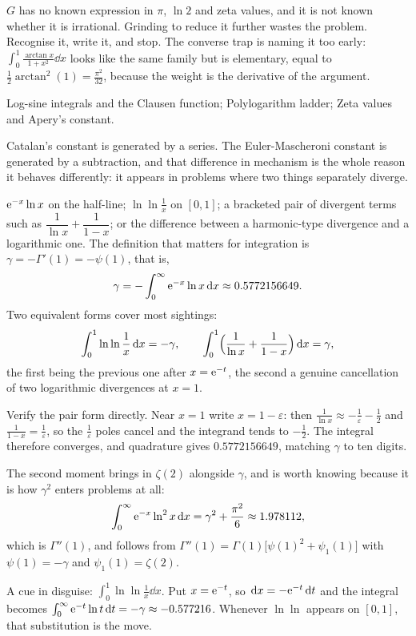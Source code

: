 \begin{trap}
$G$ has no known expression in $\pi$, $\ln2$ and zeta values, and it is not known whether it is irrational. Grinding to reduce it further wastes the problem. Recognise it, write it, and stop. The converse trap is naming it too early: $\int_0^1\frac{\arctan x}{1+x^{2}}\dd x$ looks like the same family but is elementary, equal to $\tfrac12\arctan^{2}(1)=\tfrac{\pi^{2}}{32}$, because the weight is the derivative of the argument.
\end{trap}

\begin{seealsob}Log-sine integrals and the Clausen function; Polylogarithm ladder; Zeta values and Apery's constant.\end{seealsob}

Catalan's constant is generated by a series. The Euler-Mascheroni constant is generated by a subtraction, and that difference in mechanism is the whole reason it behaves differently: it appears in problems where two things separately diverge.

\cue $\mathrm{e}^{-x}\ln x$ on the half-line; $\ln\ln\tfrac1x$ on $[0,1]$; a bracketed pair of divergent terms such as $\dfrac{1}{\ln x}+\dfrac{1}{1-x}$; or the difference between a harmonic-type divergence and a logarithmic one.
\method The definition that matters for integration is $\gamma=-\Gamma'(1)=-\psi(1)$, that is,
\[\gamma=-\int_0^{\infty}\mathrm{e}^{-x}\ln x\,\mathrm{d} x\approx0.5772156649.\]
Two equivalent forms cover most sightings:
\[\int_0^1\ln\ln\frac1x\,\mathrm{d} x=-\gamma,\qquad \int_0^1\Bigl(\frac{1}{\ln x}+\frac{1}{1-x}\Bigr)\,\mathrm{d} x=\gamma,\]
the first being the previous one after $x=\mathrm{e}^{-t}$, the second a genuine cancellation of two logarithmic divergences at $x=1$.

\begin{worked}
Verify the pair form directly. Near $x=1$ write $x=1-\varepsilon$: then $\tfrac{1}{\ln x}\approx-\tfrac1\varepsilon-\tfrac12$ and $\tfrac{1}{1-x}=\tfrac1\varepsilon$, so the $\tfrac1\varepsilon$ poles cancel and the integrand tends to $-\tfrac12$. The integral therefore converges, and quadrature gives $0.5772156649$, matching $\gamma$ to ten digits.

The second moment brings in $\zeta(2)$ alongside $\gamma$, and is worth knowing because it is how $\gamma^{2}$ enters problems at all:
\[\int_0^{\infty}\mathrm{e}^{-x}\ln^{2}x\,\mathrm{d} x=\gamma^{2}+\frac{\pi^{2}}{6}\approx1.978112,\]
which is $\Gamma''(1)$, and follows from $\Gamma''(1)=\Gamma(1)\bigl[\psi(1)^{2}+\psi_1(1)\bigr]$ with $\psi(1)=-\gamma$ and $\psi_1(1)=\zeta(2)$.

A cue in disguise: $\int_0^1\ln\ln\tfrac1x\dd x$. Put $x=\mathrm{e}^{-t}$, so $\,\mathrm{d} x=-\mathrm{e}^{-t}\,\mathrm{d} t$ and the integral becomes $\int_0^{\infty}\mathrm{e}^{-t}\ln t\,\mathrm{d} t=-\gamma\approx-0.577216$. Whenever $\ln\ln$ appears on $[0,1]$, that substitution is the move.
\end{worked}

